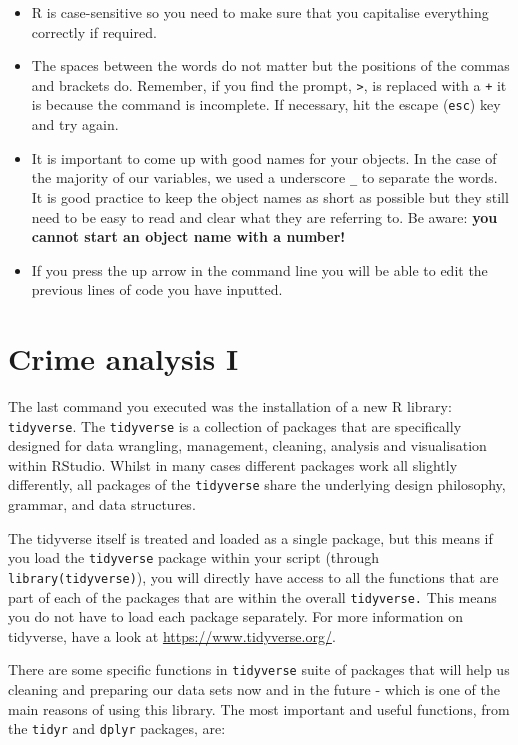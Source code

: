 \documentclass[
]{book}
\providecommand{\tightlist}{%
  \setlength{\itemsep}{0pt}\setlength{\parskip}{0pt}}
\begin{document}
\begin{itemize}
\tightlist
\item
  R is case-sensitive so you need to make sure that you capitalise everything correctly if required.
\item
  The spaces between the words do not matter but the positions of the commas and brackets do. Remember, if you find the prompt, \texttt{\textgreater{}}, is replaced with a \texttt{+} it is because the command is incomplete. If necessary, hit the escape (\texttt{esc}) key and try again.
\item
  It is important to come up with good names for your objects. In the case of the majority of our variables, we used a underscore \texttt{\_} to separate the words. It is good practice to keep the object names as short as possible but they still need to be easy to read and clear what they are referring to. Be aware: \textbf{you cannot start an object name with a number!}
\item
  If you press the up arrow in the command line you will be able to edit the previous lines of code you have inputted.
\end{itemize}

\hypertarget{crime-analysis-i}{%
\section{Crime analysis I}\label{crime-analysis-i}}

The last command you executed was the installation of a new R library: \texttt{tidyverse}. The \texttt{tidyverse} is a collection of packages that are specifically designed for data wrangling, management, cleaning, analysis and visualisation within RStudio. Whilst in many cases different packages work all slightly differently, all packages of the \texttt{tidyverse} share the underlying design philosophy, grammar, and data structures.

The tidyverse itself is treated and loaded as a single package, but this means if you load the \texttt{tidyverse} package within your script (through \texttt{library(tidyverse)}), you will directly have access to all the functions that are part of each of the packages that are within the overall \texttt{tidyverse.} This means you do not have to load each package separately. For more information on tidyverse, have a look at \url{https://www.tidyverse.org/}.

There are some specific functions in \texttt{tidyverse} suite of packages that will help us cleaning and preparing our data sets now and in the future - which is one of the main reasons of using this library. The most important and useful functions, from the \texttt{tidyr} and \texttt{dplyr} packages, are:
\end{document}
